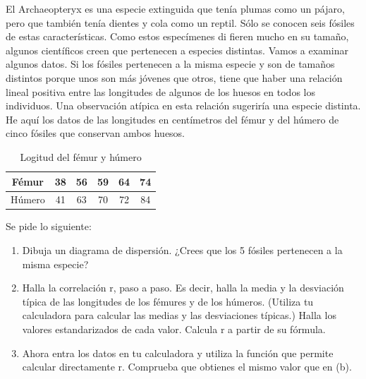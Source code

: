 \documentclass[11pt,evaluacion]{uescimat}
\begin{document}
\begin{problema}
El Archaeopteryx es una especie extinguida que tenía plumas como un pájaro, pero que también tenía dientes y cola como un reptil.
Sólo se conocen seis fósiles de estas características. Como estos especímenes di
fieren mucho en su tamaño, algunos científicos creen que pertenecen a especies
distintas. Vamos a examinar algunos datos. Si los fósiles pertenecen a la misma
especie y son de tamaños distintos porque unos son más jóvenes que otros, tiene que haber una relación lineal positiva entre las longitudes de algunos de los
huesos en todos los individuos. Una observación atípica en esta relación sugeriría
una especie distinta. He aquí los datos de las longitudes en centímetros del fémur
y del húmero de cinco fósiles que conservan ambos huesos.


\begin{table}[H]
\begin{centering}
\begin{tabular}{|c|c|c|c|c|c|}
\hline 
Fémur & 38 & 56 & 59 & 64 & 74\tabularnewline
\hline 
\hline 
Húmero & 41 & 63 & 70 & 72 & 84\tabularnewline
\hline 
\end{tabular}
\par\end{centering}
\caption{Logitud del fémur y húmero}
\end{table}

Se pide lo siguiente:

\begin{enumerate}[label=(\alph*)]
\item Dibuja un diagrama de dispersión. ¿Crees que los 5 fósiles pertenecen a la
misma especie?
\item Halla la correlación r, paso a paso. Es decir, halla la media y la desviación
típica de las longitudes de los fémures y de los húmeros. (Utiliza tu calculadora
para calcular las medias y las desviaciones típicas.) Halla los valores estandarizados de cada valor. Calcula r a partir de su fórmula.
\item Ahora entra los datos en tu calculadora y utiliza la función que permite
calcular directamente r. Comprueba que obtienes el mismo valor que en (b).

\end{enumerate}



\end{problema}
\end{document}
